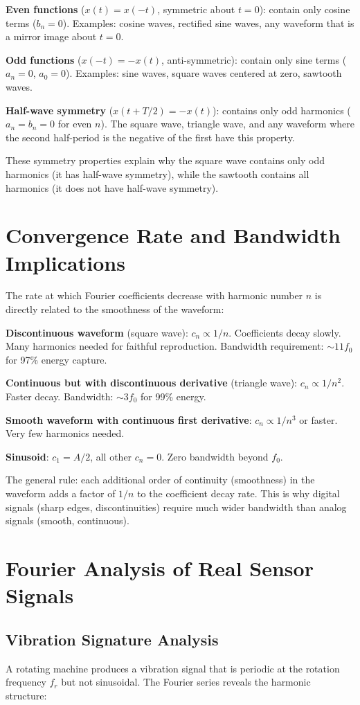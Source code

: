 \documentclass[11pt,letterpaper,twoside,openany]{book}
\begin{document}
\textbf{Even functions} ($x(t) = x(-t)$, symmetric about $t = 0$): contain only cosine terms ($b_n = 0$). Examples: cosine waves, rectified sine waves, any waveform that is a mirror image about $t = 0$.

\textbf{Odd functions} ($x(-t) = -x(t)$, anti-symmetric): contain only sine terms ($a_n = 0$, $a_0 = 0$). Examples: sine waves, square waves centered at zero, sawtooth waves.

\textbf{Half-wave symmetry} ($x(t + T/2) = -x(t)$): contains only odd harmonics ($a_n = b_n = 0$ for even $n$). The square wave, triangle wave, and any waveform where the second half-period is the negative of the first have this property.

These symmetry properties explain why the square wave contains only odd harmonics (it has half-wave symmetry), while the sawtooth contains all harmonics (it does not have half-wave symmetry).

\section{Convergence Rate and Bandwidth Implications}
The rate at which Fourier coefficients decrease with harmonic number $n$ is directly related to the smoothness of the waveform:

\textbf{Discontinuous waveform} (square wave): $c_n \propto 1/n$. Coefficients decay slowly. Many harmonics needed for faithful reproduction. Bandwidth requirement: $\sim 11f_0$ for 97\% energy capture.

\textbf{Continuous but with discontinuous derivative} (triangle wave): $c_n \propto 1/n^2$. Faster decay. Bandwidth: $\sim 3f_0$ for 99\% energy.

\textbf{Smooth waveform with continuous first derivative}: $c_n \propto 1/n^3$ or faster. Very few harmonics needed.

\textbf{Sinusoid}: $c_1 = A/2$, all other $c_n = 0$. Zero bandwidth beyond $f_0$.

The general rule: each additional order of continuity (smoothness) in the waveform adds a factor of $1/n$ to the coefficient decay rate. This is why digital signals (sharp edges, discontinuities) require much wider bandwidth than analog signals (smooth, continuous).

\section{Fourier Analysis of Real Sensor Signals}
\subsection{Vibration Signature Analysis}
A rotating machine produces a vibration signal that is periodic at the rotation frequency $f_r$ but not sinusoidal. The Fourier series reveals the harmonic structure:
\end{document}
